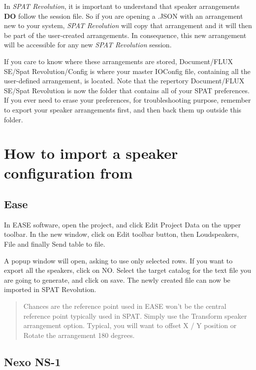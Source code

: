 \documentclass[
  letterpaper,
  DIV=11,
  numbers=noendperiod]{scrreport}
\begin{document}
In \emph{SPAT Revolution}, it is important to understand that speaker
arrangements \textbf{DO} follow the session file. So if you are opening
a .JSON with an arrangement new to your system, \emph{SPAT Revolution}
will copy that arrangement and it will then be part of the user-created
arrangements. In consequence, this new arrangement will be accessible
for any new \emph{SPAT Revolution} session.

If you care to know where these arrangements are stored, Document/FLUX
SE/Spat Revolution/Config is where your master IOConfig file, containing
all the user-defined arrangement, is located. Note that the repertory
Document/FLUX SE/Spat Revolution is now the folder that contains all of
your SPAT preferences. If you ever need to erase your preferences, for
troubleshooting purpose, remember to export your speaker arrangements
first, and then back them up outside this folder.

\hypertarget{how-to-import-a-speaker-configuration-from}{%
\section{How to import a speaker configuration
from}\label{how-to-import-a-speaker-configuration-from}}

\hypertarget{ease}{%
\subsection{Ease}\label{ease}}

In EASE software, open the project, and click Edit Project Data on the
upper toolbar. In the new window, click on Edit toolbar button, then
Loudspeakers, File and finally Send table to file.

A popup window will open, asking to use only selected rows. If you want
to export all the speakers, click on NO. Select the target catalog for
the text file you are going to generate, and click on save. The newly
created file can now be imported in SPAT Revolution.

\begin{quote}
Chances are the reference point used in EASE won't be the central
reference point typically used in SPAT. Simply use the Transform speaker
arrangement option. Typical, you will want to offset X / Y position or
Rotate the arrangement 180 degrees.
\end{quote}

\hypertarget{nexo-ns-1}{%
\subsection{Nexo NS-1}\label{nexo-ns-1}}
\end{document}
